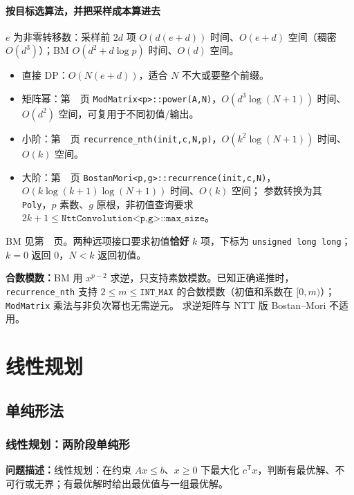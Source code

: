 \subsubsection{按目标选算法，并把采样成本算进去}
$e$ 为非零转移数：采样前 $2d$ 项 $O(d(e+d))$ 时间、$O(e+d)$ 空间（稠密 $O(d^3)$）；BM $O(d^2+d\log p)$ 时间、$O(d)$ 空间。
\begin{itemize}
\item 直接 DP：$O(N(e+d))$，适合 $N$ 不大或要整个前缀。
\item 矩阵幂：第~\pageref{compact-ModMatrix}~页 \texttt{ModMatrix<p>::power(A,N)}，$O(d^3\log(N+1))$ 时间、$O(d^2)$ 空间，可复用于不同初值/输出。
\item 小阶：第~\pageref{compact-recurrence_nth}~页 \texttt{recurrence\_nth(\allowbreak{}init,c,N,p)}，$O(k^2\log(N+1))$ 时间、$O(k)$ 空间。
\item 大阶：第~\pageref{compact-BostanMori}~页 \texttt{BostanMori<p,g>::recurrence(init,c,N)}，$O(k\log(k+1)\log(N+1))$ 时间、$O(k)$ 空间；
参数转换为其 \texttt{Poly}，$p$ 素数、$g$ 原根，非初值查询要求 $2k+1\le\texttt{NttConvolution<p,g>::max\_size}$。
\end{itemize}
BM 见第~\pageref{compact-berlekamp_massey}~页。两种远项接口要求初值\textbf{恰好} $k$ 项，下标为 \texttt{unsigned long long}；$k=0$ 返回 0，$N<k$ 返回初值。

\textbf{合数模数：}BM 用 $x^{p-2}$ 求逆，只支持素数模数。已知正确递推时，\texttt{recurrence\_nth} 支持
$2\le m\le\texttt{INT\_MAX}$ 的合数模数（初值和系数在 $[0,m)$）；\texttt{ModMatrix} 乘法与非负次幂也无需逆元。
求逆矩阵与 NTT 版 Bostan--Mori 不适用。


\Needspace{180pt}

\chapter{线性规划}

\section{单纯形法}

\subsection{线性规划：两阶段单纯形}\label{compact-Simplex}

\noindent\textbf{问题描述：}\allowbreak 线性规划：在约束 $Ax\le b$、$x\ge0$ 下最大化 $c^{\mathsf T}x$，判断有最优解、不可行或无界；有最优解时给出最优值与一组最优解。

